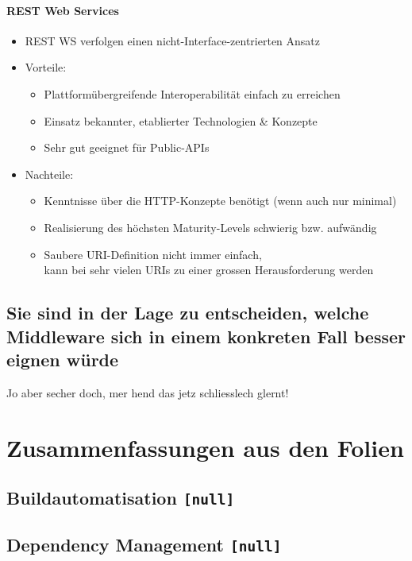 \documentclass[a4paper]{article}
\begin{document}
		\paragraph{REST Web Services}
		
			\begin{itemize}
				\item REST WS verfolgen einen nicht-Interface-zentrierten Ansatz
				\item Vorteile:
					\begin{itemize}
						\item Plattformübergreifende Interoperabilität einfach zu erreichen
						\item Einsatz bekannter, etablierter Technologien \& Konzepte
						\item Sehr gut geeignet für Public-APIs
					\end{itemize}
				\item Nachteile:
					\begin{itemize}
						\item Kenntnisse über die HTTP-Konzepte benötigt (wenn auch nur minimal)
						\item Realisierung des höchsten Maturity-Levels schwierig bzw. aufwändig
						\item Saubere URI-Definition nicht immer einfach,\\ 
						kann bei sehr vielen URIs zu einer grossen Herausforderung werden
					\end{itemize}
			\end{itemize}
		
		\subsection{Sie sind in der Lage zu entscheiden, welche Middleware sich in einem konkreten Fall besser eignen würde}
		
		Jo aber secher doch, mer hend das jetz schliesslech glernt!
		
		
	\newpage	
	\section{Zusammenfassungen aus den Folien}
	
		\subsection{Buildautomatisation \texttt{[null]}}
		
		\subsection{Dependency Management \texttt{[null]}}
		
\end{document}
